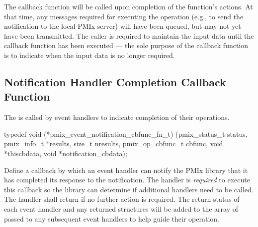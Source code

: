 \adviceuserstart
The callback function will be called upon completion of the
 function's actions. At that time, any messages required for executing the operation (e.g., to send the notification to the local \ac{PMIx} server) will
have been queued, but may not yet have been transmitted. The caller is required to maintain the input
data until the callback function has been executed --- the sole purpose of the callback function is to indicate when the input data is no longer required.
\adviceuserend

\subsection{Notification Handler Completion Callback Function}

\summary

The  is called by event handlers to indicate completion of their operations.

\cspecificstart
\begin{codepar}
typedef void (*pmix_event_notification_cbfunc_fn_t)
    (pmix_status_t status,
     pmix_info_t *results, size_t nresults,
     pmix_op_cbfunc_t cbfunc, void *thiscbdata,
     void *notification_cbdata);
\end{codepar}
\cspecificend

\begin{arglist}
\end{arglist}

\descr

Define a callback by which an event handler can notify the \ac{PMIx} library that it has completed its response to the notification. The handler is \textit{required} to execute this callback so the library can determine if additional handlers need to be called. The handler shall return  if no further action is required. The return status of each event handler and any returned  structures will be added to the  array of  passed to any subsequent event handlers to help guide their operation.

